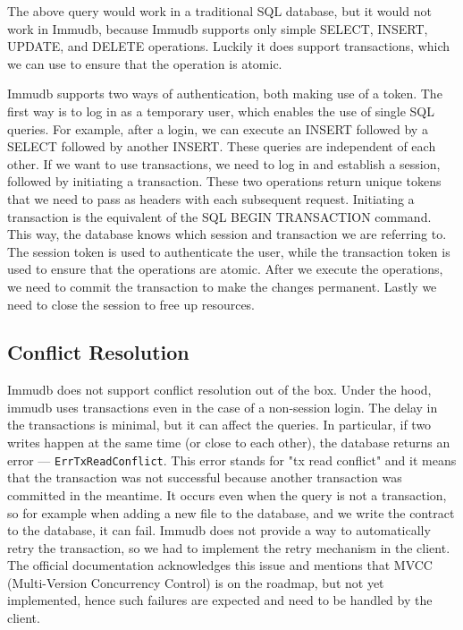 The above query would work in a traditional SQL database, but it would not work in Immudb,
because Immudb supports only simple SELECT, INSERT, UPDATE, and DELETE operations.
Luckily it does support transactions, which we can use to ensure that the operation is atomic.

Immudb supports two ways of authentication, both making use of a token.
The first way is to log in as a temporary user, which enables the use of single SQL queries.
For example, after a login, we can execute an INSERT followed by a SELECT followed by another INSERT.
These queries are independent of each other.
If we want to use transactions, we need to log in and establish a session, followed by initiating a transaction.
These two operations return unique tokens that we need to pass as headers with each subsequent request.
Initiating a transaction is the equivalent of the SQL BEGIN TRANSACTION command.
This way, the database knows which session and transaction we are referring to.
The session token is used to authenticate the user,
while the transaction token is used to ensure that the operations are atomic.
After we execute the operations, we need to commit the transaction to make the changes permanent.
Lastly we need to close the session to free up resources.

\subsection{Conflict Resolution}

Immudb does not support conflict resolution out of the box.
Under the hood, immudb uses transactions even in the case of a non-session login.
The delay in the transactions is minimal, but it can affect the queries.
In particular, if two writes happen at the same time (or close to each other),
the database returns an error --- \texttt{ErrTxReadConflict}.
This error stands for "tx read conflict" and it means that the transaction was not successful
because another transaction was committed in the meantime.
It occurs even when the query is not a transaction,
so for example when adding a new file to the database, and we write the contract to the database, it can fail.
Immudb does not provide a way to automatically retry the transaction,
so we had to implement the retry mechanism in the client.
The official documentation acknowledges this issue and mentions that MVCC (Multi-Version Concurrency Control)
is on the roadmap, but not yet implemented, hence such failures are expected and need to be handled by the client.

